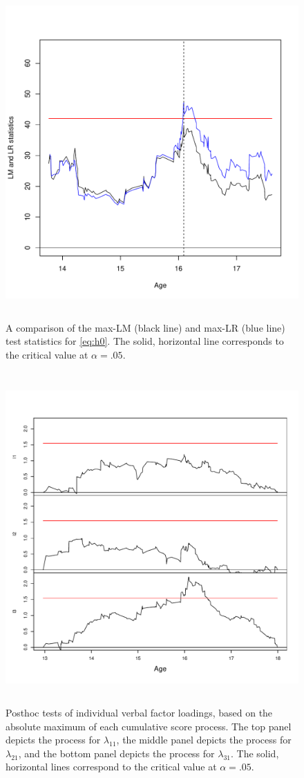 \documentclass[man]{apa}
\begin{document}
\begin{figure}
\caption{A comparison of the max-LM (black line) and max-LR (blue line) test
  statistics for \eqref{eq:h0}.  The solid, horizontal line
  corresponds to the critical value at $\alpha=.05$.}
\label{fig:lrlm}
\includegraphics[height=5in]{lmlr_19.pdf}
\end{figure}

\begin{figure}
\caption{Posthoc tests of individual verbal factor loadings, based on
  the absolute maximum of each cumulative score process.  The top
  panel depicts the process for $\lambda_{11}$, the middle panel
  depicts the process for $\lambda_{21}$, and the bottom panel depicts
  the process for $\lambda_{31}$.  The solid, horizontal lines
  correspond to the critical value at $\alpha=.05$.}
\label{fig:posthoc}
\includegraphics[height=5in]{gefp_posthoc.pdf}
\end{figure}
\end{document}
